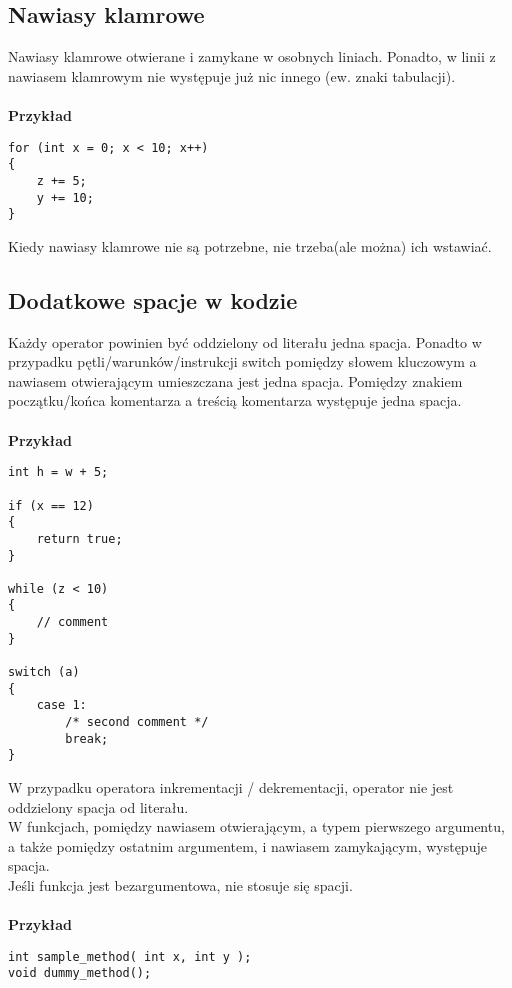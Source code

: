 \documentclass[titlepage]{article}
\begin{document}
\subsection{Nawiasy klamrowe}
Nawiasy klamrowe otwierane i zamykane w osobnych liniach. Ponadto, w linii z nawiasem klamrowym nie występuje już nic innego (ew. znaki tabulacji).

\paragraph{}
\textbf{Przykład}
\begin{lstlisting}
for (int x = 0; x < 10; x++)
{
	z += 5;
	y += 10;
}
\end{lstlisting}
Kiedy nawiasy klamrowe nie są potrzebne, nie trzeba(ale można) ich wstawiać.

\subsection{Dodatkowe spacje w kodzie}
Każdy operator powinien być oddzielony od literału jedna spacja. Ponadto w przypadku pętli/warunków/instrukcji switch pomiędzy słowem kluczowym a nawiasem otwierającym umieszczana jest jedna spacja. Pomiędzy znakiem początku/końca komentarza a treścią komentarza występuje jedna spacja.
\paragraph{}
\textbf{Przykład}
\begin{lstlisting}
int h = w + 5;

if (x == 12)
{
	return true;
}

while (z < 10)
{
	// comment
}

switch (a)
{
	case 1:
		/* second comment */
		break;
}
\end{lstlisting}
W przypadku operatora inkrementacji / dekrementacji, operator nie jest oddzielony spacja od literału.\\
W funkcjach, pomiędzy nawiasem otwierającym, a typem pierwszego argumentu, a także pomiędzy ostatnim argumentem, i nawiasem zamykającym, występuje spacja.\\
Jeśli funkcja jest bezargumentowa, nie stosuje się spacji.
\paragraph{}
\textbf{Przykład}
\begin{lstlisting}
int sample_method( int x, int y );
void dummy_method();
\end{lstlisting}
\end{document}
